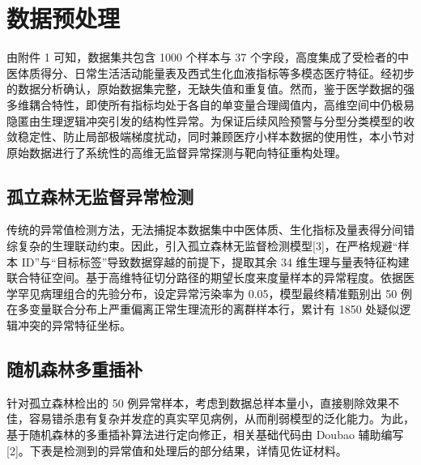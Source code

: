 \documentclass[12pt]{article}
\begin{document}
	\section{数据预处理}
	{\songti{}
		由附件 1 可知，数据集共包含 1000 个样本与 37 个字段，高度集成了受检者的中医体质得分、日常生活活动能量表及西式生化血液指标等多模态医疗特征。经初步的数据分析确认，原始数据集完整，无缺失值和重复值。然而，鉴于医学数据的强多维耦合特性，即使所有指标均处于各自的单变量合理阈值内，高维空间中仍极易隐匿由生理逻辑冲突引发的结构性异常。为保证后续风险预警与分型分类模型的收敛稳定性、防止局部极端梯度扰动，同时兼顾医疗小样本数据的使用性，本小节对原始数据进行了系统性的高维无监督异常探测与靶向特征重构处理。\par}
	
	\subsection{孤立森林无监督异常检测}
	{\songti{}
		传统的异常值检测方法，无法捕捉本数据集中中医体质、生化指标及量表得分间错综复杂的生理联动约束。因此，引入孤立森林无监督检测模型[3]，在严格规避“样本 ID”与“目标标签”导致数据穿越的前提下，提取其余 34 维生理与量表特征构建联合特征空间。基于高维特征切分路径的期望长度来度量样本的异常程度。依据医学罕见病理组合的先验分布，设定异常污染率为 0.05，模型最终精准甄别出 50 例在多变量联合分布上严重偏离正常生理流形的离群样本行，累计有 1850 处疑似逻辑冲突的异常特征坐标。\par}
	
	\subsection{随机森林多重插补}
	{\songti{}
		针对孤立森林检出的 50 例异常样本，考虑到数据总样本量小，直接剔除效果不佳，容易错杀患有复杂并发症的真实罕见病例，从而削弱模型的泛化能力。为此，基于随机森林的多重插补算法进行定向修正，相关基础代码由 Doubao 辅助编写[2]。下表是检测到的异常值和处理后的部分结果，详情见佐证材料。\par}
	
\end{document}
